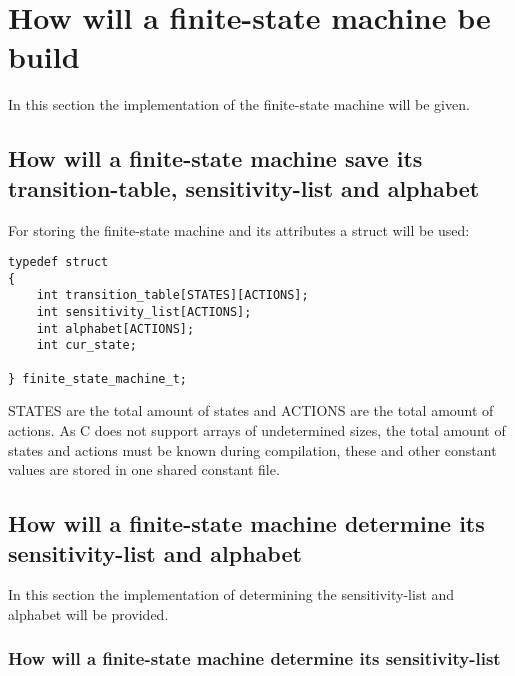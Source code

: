 \hypertarget{how-will-a-finite-state-machine-be-build}{%
\section{How will a finite-state machine be
build}\label{how-will-a-finite-state-machine-be-build}}

In this section the implementation of the finite-state machine will be
given.

\hypertarget{how-will-a-finite-state-machine-save-its-transition-table-sensitivity-list-and-alphabet}{%
\subsection{How will a finite-state machine save its transition-table,
sensitivity-list and
alphabet}\label{how-will-a-finite-state-machine-save-its-transition-table-sensitivity-list-and-alphabet}}

For storing the finite-state machine and its attributes a struct will be
used:

\begin{verbatim}
typedef struct
{
    int transition_table[STATES][ACTIONS];
    int sensitivity_list[ACTIONS];
    int alphabet[ACTIONS];
    int cur_state;

} finite_state_machine_t;
\end{verbatim}

STATES are the total amount of states and ACTIONS are the total amount
of actions. As C does not support arrays of undetermined sizes, the
total amount of states and actions must be known during compilation,
these and other constant values are stored in one shared constant file.

\hypertarget{how-will-a-finite-state-machine-determine-its-sensitivity-list-and-alphabet}{%
\subsection{How will a finite-state machine determine its
sensitivity-list and
alphabet}\label{how-will-a-finite-state-machine-determine-its-sensitivity-list-and-alphabet}}

In this section the implementation of determining the sensitivity-list
and alphabet will be provided.

\hypertarget{how-will-a-finite-state-machine-determine-its-sensitivity-list}{%
\subsubsection{How will a finite-state machine determine its
sensitivity-list}\label{how-will-a-finite-state-machine-determine-its-sensitivity-list}}

